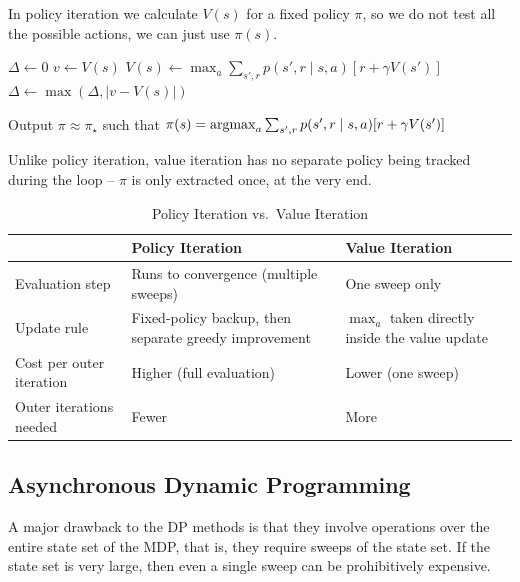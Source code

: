 In policy iteration we calculate $V(s)$ for a fixed policy $\pi$, so we do not test all the possible actions, we can just use $\pi(s)$.


\begin{algorithm}
    \caption{Value iteration for estimating $\pi \approx \pi_\star$}
    \begin{algorithmic}[1]
        \Repeat
            \State $\Delta \gets 0$
                \State $v \gets V(s)$
                \State $V(s) \gets \max_a \sum_{s',r} p(s',r \mid s,a) [r + \gamma V(s')]$
                \State $\Delta \gets \max(\Delta, |v-V(s)|)$
            \EndFor
        \Until{$\Delta < \theta$}

        \State Output $\pi \approx \pi_\star$ such that $\pi(s) = \operatorname*{argmax}_a \sum_{s',r}  p(s',r \mid s,a) [r + \gamma V(s')]$
    \end{algorithmic}
\end{algorithm}

Unlike policy iteration, value iteration has no separate policy being tracked during the loop -- 
$\pi$ is only extracted once, at the very end.

\begin{table}[h]
    \centering
    \caption{Policy Iteration vs.\ Value Iteration}
    \begin{tabularx}{\textwidth}{lXX}
    \toprule
     & \textbf{Policy Iteration} & \textbf{Value Iteration} \\
    \midrule
    Evaluation step & Runs to convergence (multiple sweeps) & One sweep only \\
    Update rule & Fixed-policy backup, then separate greedy improvement & $\max_a$ taken directly inside the value update \\
    Cost per outer iteration & Higher (full evaluation) & Lower (one sweep) \\
    Outer iterations needed & Fewer & More \\
    \bottomrule
    \end{tabularx}
\end{table}

\subsection{Asynchronous Dynamic Programming}
A major drawback to the DP methods is that they involve operations over the entire state set of the MDP, that is, they require sweeps of the state set. If the state set is very large, then even a single sweep can be prohibitively expensive.

